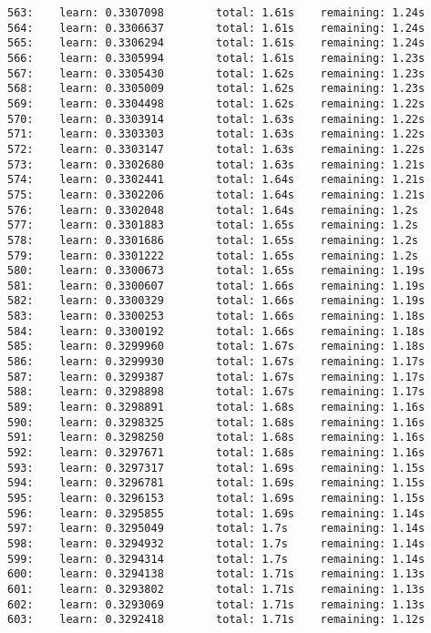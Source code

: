 \documentclass[11pt]{article}
\begin{document}
\begin{Verbatim}[commandchars=\\\{\}]
563:    learn: 0.3307098        total: 1.61s    remaining: 1.24s
564:    learn: 0.3306637        total: 1.61s    remaining: 1.24s
565:    learn: 0.3306294        total: 1.61s    remaining: 1.24s
566:    learn: 0.3305994        total: 1.61s    remaining: 1.23s
567:    learn: 0.3305430        total: 1.62s    remaining: 1.23s
568:    learn: 0.3305009        total: 1.62s    remaining: 1.23s
569:    learn: 0.3304498        total: 1.62s    remaining: 1.22s
570:    learn: 0.3303914        total: 1.63s    remaining: 1.22s
571:    learn: 0.3303303        total: 1.63s    remaining: 1.22s
572:    learn: 0.3303147        total: 1.63s    remaining: 1.22s
573:    learn: 0.3302680        total: 1.63s    remaining: 1.21s
574:    learn: 0.3302441        total: 1.64s    remaining: 1.21s
575:    learn: 0.3302206        total: 1.64s    remaining: 1.21s
576:    learn: 0.3302048        total: 1.64s    remaining: 1.2s
577:    learn: 0.3301883        total: 1.65s    remaining: 1.2s
578:    learn: 0.3301686        total: 1.65s    remaining: 1.2s
579:    learn: 0.3301222        total: 1.65s    remaining: 1.2s
580:    learn: 0.3300673        total: 1.65s    remaining: 1.19s
581:    learn: 0.3300607        total: 1.66s    remaining: 1.19s
582:    learn: 0.3300329        total: 1.66s    remaining: 1.19s
583:    learn: 0.3300253        total: 1.66s    remaining: 1.18s
584:    learn: 0.3300192        total: 1.66s    remaining: 1.18s
585:    learn: 0.3299960        total: 1.67s    remaining: 1.18s
586:    learn: 0.3299930        total: 1.67s    remaining: 1.17s
587:    learn: 0.3299387        total: 1.67s    remaining: 1.17s
588:    learn: 0.3298898        total: 1.67s    remaining: 1.17s
589:    learn: 0.3298891        total: 1.68s    remaining: 1.16s
590:    learn: 0.3298325        total: 1.68s    remaining: 1.16s
591:    learn: 0.3298250        total: 1.68s    remaining: 1.16s
592:    learn: 0.3297671        total: 1.68s    remaining: 1.16s
593:    learn: 0.3297317        total: 1.69s    remaining: 1.15s
594:    learn: 0.3296781        total: 1.69s    remaining: 1.15s
595:    learn: 0.3296153        total: 1.69s    remaining: 1.15s
596:    learn: 0.3295855        total: 1.69s    remaining: 1.14s
597:    learn: 0.3295049        total: 1.7s     remaining: 1.14s
598:    learn: 0.3294932        total: 1.7s     remaining: 1.14s
599:    learn: 0.3294314        total: 1.7s     remaining: 1.14s
600:    learn: 0.3294138        total: 1.71s    remaining: 1.13s
601:    learn: 0.3293802        total: 1.71s    remaining: 1.13s
602:    learn: 0.3293069        total: 1.71s    remaining: 1.13s
603:    learn: 0.3292418        total: 1.71s    remaining: 1.12s

\end{Verbatim}
\end{document}
